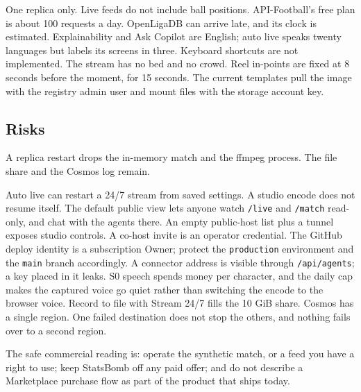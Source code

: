 \documentclass[11pt]{article}
\begin{document}
One replica only.
Live feeds do not include ball positions.
API-Football's free plan is about 100 requests a day.
OpenLigaDB can arrive late, and its clock is estimated.
Explainability and Ask Copilot are English; auto live speaks twenty languages but
labels its screens in three.
Keyboard shortcuts are not implemented.
The stream has no bed and no crowd.
Reel in-points are fixed at 8 seconds before the moment, for 15 seconds.
The current templates pull the image with the registry admin user and mount
files with the storage account key.

\subsection{Risks}

A replica restart drops the in-memory match and the ffmpeg process.
The file share and the Cosmos log remain.

\begin{center}
\end{center}

Auto live can restart a 24/7 stream from saved settings.
A studio encode does not resume itself.
The default public view lets anyone watch \texttt{/live} and \texttt{/match} read-only,
and chat with the agents there.
An empty public-host list plus a tunnel exposes studio controls.
A co-host invite is an operator credential.
The GitHub deploy identity is a subscription Owner; protect the \texttt{production}
environment and the \texttt{main} branch accordingly.
A connector address is visible through \texttt{/api/agents}; a key placed in it leaks.
S0 speech spends money per character, and the daily cap makes the captured voice
go quiet rather than switching the encode to the browser voice.
Record to file with Stream 24/7 fills the 10 GiB share.
Cosmos has a single region.
One failed destination does not stop the others, and nothing fails over to a
second region.

The safe commercial reading is: operate the synthetic match, or a feed you have
a right to use; keep StatsBomb off any paid offer; and do not describe a
Marketplace purchase flow as part of the product that ships today.
\end{document}
